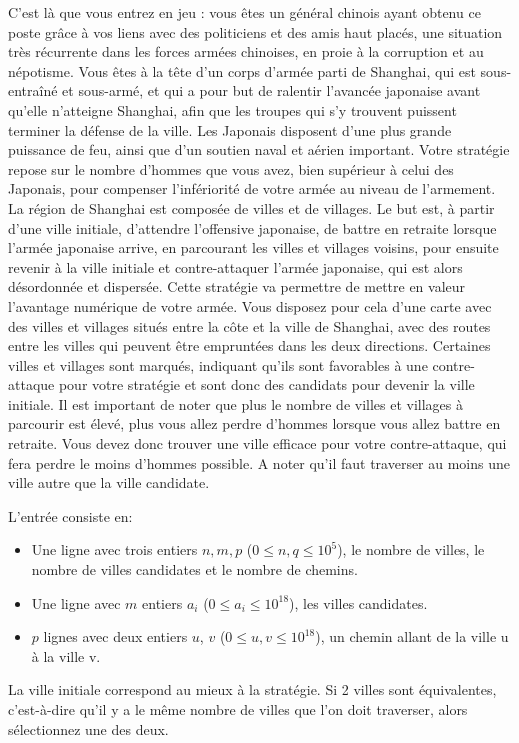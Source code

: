 C’est là que vous entrez en jeu : vous êtes un général chinois ayant obtenu ce poste grâce à vos liens avec des politiciens et des amis haut placés, une situation très récurrente dans les forces armées chinoises, en proie à la corruption et au népotisme.
Vous êtes à la tête d’un corps d’armée parti de Shanghai, qui est sous-entraîné et sous-armé, et qui a pour but de ralentir l’avancée japonaise avant qu’elle n’atteigne Shanghai, afin que les troupes qui s’y trouvent puissent terminer la défense de la ville.
Les Japonais disposent d’une plus grande puissance de feu, ainsi que d’un soutien naval et aérien important.
Votre stratégie repose sur le nombre d’hommes que vous avez, bien supérieur à celui des Japonais, pour compenser l’infériorité de votre armée au niveau de l’armement.
La région de Shanghai est composée de villes et de villages. Le but est, à partir d’une ville initiale, d’attendre l’offensive japonaise, de battre en retraite lorsque l’armée japonaise arrive, en parcourant les villes et villages voisins, pour ensuite revenir à la ville initiale et contre-attaquer l’armée japonaise, qui est alors désordonnée et dispersée. Cette stratégie va permettre de mettre en valeur l’avantage numérique de votre armée. Vous disposez pour cela d’une carte avec des villes et villages situés entre la côte et la ville de Shanghai, avec des routes entre les villes qui peuvent être empruntées dans les deux directions. Certaines villes et villages sont marqués, indiquant qu’ils sont favorables à une contre-attaque pour votre stratégie et sont donc des candidats pour devenir la ville initiale. Il est important de noter que plus le nombre de villes et villages à parcourir est élevé, plus vous allez perdre d’hommes lorsque vous allez battre en retraite. Vous devez donc trouver une ville efficace pour votre contre-attaque, qui fera perdre le moins d’hommes possible. A noter qu'il faut traverser au moins une ville autre que la ville candidate.

\begin{Input}
    L'entrée consiste en:
    \begin{itemize}
        \item Une ligne avec trois entiers $n, m, p$ ($0\leq n, q\leq 10^5$), le nombre de villes, le nombre de villes candidates et le nombre de chemins.
        \item Une ligne avec $m$ entiers $a_i$ ($0  \leq a_i \leq 10^{18}$), les villes candidates.
        \item $p$ lignes avec deux entiers $u$, $v$ ($0 \leq u, v \leq 10^{18}$), un chemin allant de la ville u à la ville v.
    \end{itemize}
\end{Input}

\begin{Output}
    La ville initiale correspond au mieux à la stratégie. Si 2 villes sont équivalentes, c'est-à-dire qu'il y a le même nombre de villes que l'on doit traverser, alors sélectionnez une des deux.
\end{Output}
